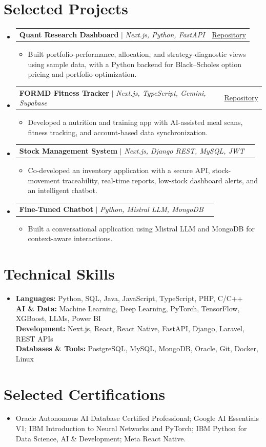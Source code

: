 \documentclass[letterpaper,11pt]{article}
\makeatletter
\newcommand{\resumeItem}[1]{\item\small{#1}}
\newcommand{\resumeProjectHeading}[2]{
  \item\begin{tabular*}{0.97\textwidth}{l@{\extracolsep{\fill}}r}
    \small#1 & \small#2 \\
  \end{tabular*}\vspace{-6pt}}
\newcommand{\resumeSubHeadingListStart}{\begin{itemize}[leftmargin=0.15in,label={},itemsep=5pt,topsep=3pt]}
\newcommand{\resumeSubHeadingListEnd}{\end{itemize}\vspace{-5pt}}
\newcommand{\resumeItemListStart}{\begin{itemize}[leftmargin=0.2in,itemsep=1pt,topsep=5pt]}
\newcommand{\resumeItemListEnd}{\end{itemize}\vspace{-5pt}}
\makeatother
\begin{document}
\section{Selected Projects}
\resumeSubHeadingListStart
  \resumeProjectHeading{\textbf{Quant Research Dashboard} $|$ \emph{Next.js, Python, FastAPI}}{\href{https://github.com/N-Aymane/quant-research-dashboard}{Repository}}
  \resumeItemListStart
    \resumeItem{Built portfolio-performance, allocation, and strategy-diagnostic views using sample data, with a Python backend for Black--Scholes option pricing and portfolio optimization.}
  \resumeItemListEnd
  \resumeProjectHeading{\textbf{FORMD Fitness Tracker} $|$ \emph{Next.js, TypeScript, Gemini, Supabase}}{\href{https://github.com/N-Aymane/formd-fitness-tracker}{Repository}}
  \resumeItemListStart
    \resumeItem{Developed a nutrition and training app with AI-assisted meal scans, fitness tracking, and account-based data synchronization.}
  \resumeItemListEnd
  \resumeProjectHeading{\textbf{Stock Management System} $|$ \emph{Next.js, Django REST, MySQL, JWT}}{}
  \resumeItemListStart
    \resumeItem{Co-developed an inventory application with a secure API, stock-movement traceability, real-time reports, low-stock dashboard alerts, and an intelligent chatbot.}
  \resumeItemListEnd
  \resumeProjectHeading{\textbf{Fine-Tuned Chatbot} $|$ \emph{Python, Mistral LLM, MongoDB}}{}
  \resumeItemListStart
    \resumeItem{Built a conversational application using Mistral LLM and MongoDB for context-aware interactions.}
  \resumeItemListEnd
\resumeSubHeadingListEnd

\section{Technical Skills}
\begin{itemize}[leftmargin=0.15in,label={},topsep=3pt]
  \small\item{
    \textbf{Languages:} Python, SQL, Java, JavaScript, TypeScript, PHP, C/C++ \\
    \textbf{AI \& Data:} Machine Learning, Deep Learning, PyTorch, TensorFlow, XGBoost, LLMs, Power BI \\
    \textbf{Development:} Next.js, React, React Native, FastAPI, Django, Laravel, REST APIs \\
    \textbf{Databases \& Tools:} PostgreSQL, MySQL, MongoDB, Oracle, Git, Docker, Linux
  }
\end{itemize}\vspace{-9pt}

\section{Selected Certifications}
\begin{itemize}[leftmargin=0.15in,label={},topsep=3pt]
  \small\item{Oracle Autonomous AI Database Certified Professional; Google AI Essentials V1; IBM Introduction to Neural Networks and PyTorch; IBM Python for Data Science, AI \& Development; Meta React Native.}
\end{itemize}
\end{document}
